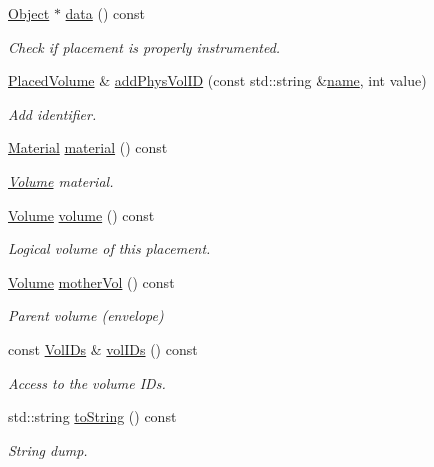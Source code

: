 \begin{DoxyCompactItemize}
\hyperlink{class_d_d4hep_1_1_geometry_1_1_placed_volume_a9ae505098ca6976164b959e1d8b4bbb0}{Object} $\ast$ \hyperlink{class_d_d4hep_1_1_geometry_1_1_placed_volume_a7288ed4675e755318d1ec6f05fbcf8b9}{data} () const
\begin{DoxyCompactList}\small\item\em Check if placement is properly instrumented. \end{DoxyCompactList}\item 
\hyperlink{class_d_d4hep_1_1_geometry_1_1_placed_volume}{Placed\+Volume} \& \hyperlink{class_d_d4hep_1_1_geometry_1_1_placed_volume_ad9d58c0450d581b931911a1c6cb3ce07}{add\+Phys\+Vol\+ID} (const std\+::string \&\hyperlink{class_d_d4hep_1_1_handle_a27c7d467a609ab32c133e1f3c7d85ef5}{name}, int value)
\begin{DoxyCompactList}\small\item\em Add identifier. \end{DoxyCompactList}\item 
\hyperlink{class_d_d4hep_1_1_geometry_1_1_material}{Material} \hyperlink{class_d_d4hep_1_1_geometry_1_1_placed_volume_a0d8e672c9e72421f1c46a3419d6375e5}{material} () const
\begin{DoxyCompactList}\small\item\em \hyperlink{class_d_d4hep_1_1_geometry_1_1_volume}{Volume} material. \end{DoxyCompactList}\item 
\hyperlink{class_d_d4hep_1_1_geometry_1_1_volume}{Volume} \hyperlink{class_d_d4hep_1_1_geometry_1_1_placed_volume_a13113feba33041cee2738730ab70a9fc}{volume} () const
\begin{DoxyCompactList}\small\item\em Logical volume of this placement. \end{DoxyCompactList}\item 
\hyperlink{class_d_d4hep_1_1_geometry_1_1_volume}{Volume} \hyperlink{class_d_d4hep_1_1_geometry_1_1_placed_volume_aece40c15a283a40a857498be4a857103}{mother\+Vol} () const
\begin{DoxyCompactList}\small\item\em Parent volume (envelope) \end{DoxyCompactList}\item 
const \hyperlink{class_d_d4hep_1_1_geometry_1_1_placed_volume_a4383991fbc94adc2997ef98c9d30d9a6}{Vol\+I\+Ds} \& \hyperlink{class_d_d4hep_1_1_geometry_1_1_placed_volume_a302037d5e140c5b832ba8057466d8214}{vol\+I\+Ds} () const
\begin{DoxyCompactList}\small\item\em Access to the volume I\+Ds. \end{DoxyCompactList}\item 
std\+::string \hyperlink{class_d_d4hep_1_1_geometry_1_1_placed_volume_a7122ff02df1ffd1e1dffcd121620edff}{to\+String} () const
\begin{DoxyCompactList}\small\item\em String dump. \end{DoxyCompactList}\end{DoxyCompactItemize}

